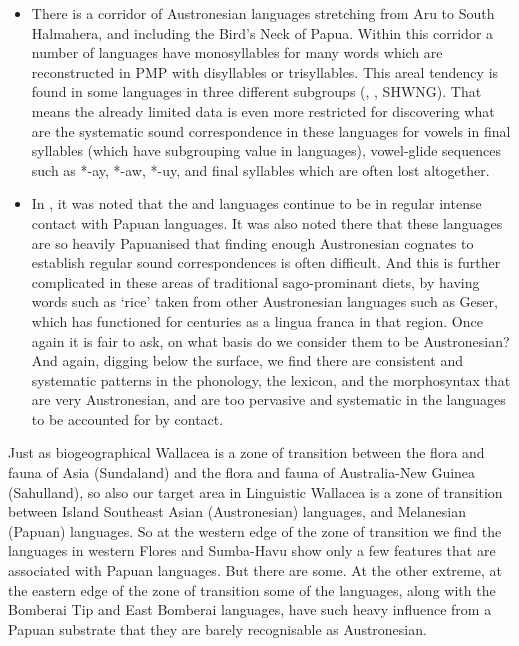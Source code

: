 \begin{itemize}
			But they are also not “Austronesian” in the same way as languages
			in western Indonesia or the Philippines.
\item	There is a corridor of Austronesian languages stretching from
			Aru to South Halmahera,
			and including the Bird’s Neck of Papua.
			Within this corridor a number of languages have monosyllables
			for many words which are reconstructed in PMP with disyllables or trisyllables.
			This areal tendency is found in some languages in three different
			subgroups (, , SHWNG).
			That means the already limited data is even more restricted for
			discovering what are the systematic sound correspondence in these
			languages for vowels in final syllables (which have subgrouping
			value in  languages),
			vowel-glide sequences such as *-ay,
			*-aw, *-uy, and final syllables which are often lost altogether.
\item	In ,
			it was noted that the 
			and  languages continue to be in regular intense
			contact with Papuan languages.
			It was also noted there that these languages are so heavily Papuanised
			that finding enough Austronesian cognates to establish regular
			sound correspondences is often difficult.
			And this is further complicated in these areas of traditional
			sago-prominant diets, by having words such as ‘rice’ taken from other Austronesian
			languages such as Geser,
			which has functioned for centuries as a lingua franca in that region.
			Once again it is fair to ask,
			on what basis do we consider them to be Austronesian?
			And again, digging below the surface,
			we find there are consistent
			and systematic patterns in the phonology,
			the lexicon, and the morphosyntax that are very Austronesian,
			and are too pervasive
			and systematic in the languages to be accounted for by contact.	
\end{itemize}

Just as biogeographical Wallacea is a zone of transition between
the flora and fauna of Asia (Sundaland)
and the flora and fauna of Australia-New Guinea (Sahulland),
so also our target area in Linguistic Wallacea is a zone of transition
between Island Southeast Asian (Austronesian) languages,
and Melanesian (Papuan) languages.
So at the western edge of the zone of transition we find the
languages in western Flores
and Sumba-Havu show only a few features that are associated with Papuan languages.
But there are some.
At the other extreme,
at the eastern edge of the zone of transition some of the 
languages, along with the Bomberai Tip
and East Bomberai languages,
have such heavy influence from a Papuan substrate that they are
barely recognisable as Austronesian.